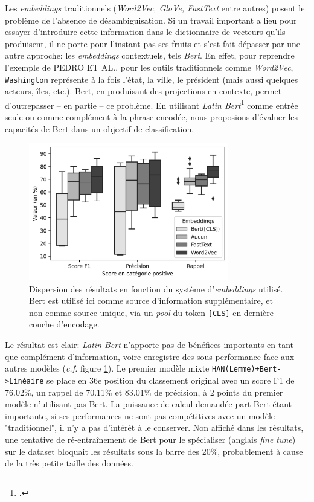 Les \textit{embeddings} traditionnels (\textit{Word2Vec, GloVe, FastText} entre autres) posent le problème de l'absence de désambiguisation. Si un travail important a lieu pour essayer d'introduire cette information dans le dictionnaire de vecteurs qu'ils produisent, il ne porte pour l'instant pas ses fruits et s'est fait dépasser par une autre approche: les \textit{embeddings} contextuels, tels \textit{Bert}. En effet, pour reprendre l'exemple de PEDRO ET AL., pour les outils traditionnels comme \textit{Word2Vec}, \texttt{Washington} représente à la fois l'état, la ville, le président (mais aussi quelques acteurs, îles, etc.). Bert, en produisant des projections en contexte, permet d'outrepasser -- en partie -- ce problème. En utilisant \textit{Latin Bert}\footcite{bamman2020latin} comme entrée seule ou comme complément à la phrase encodée, nous proposions d'évaluer les capacités de Bert dans un objectif de classification.

\begin{figure}[t]
    \centering
    \includegraphics[height=6cm]{figures/chap4/scoreDispersionEmbeddings.png}
    \caption{Dispersion des résultats en fonction du système d'\textit{embeddings} utilisé. Bert est utilisé ici comme source  d'information supplémentaire, et non comme source unique, via un \textit{pool} du token \texttt{[CLS]} en dernière couche d'encodage.}
    \label{fig:chap4:bert-dispersion-fusion}
\end{figure}

Le résultat est clair: \textit{Latin Bert} n'apporte pas de bénéfices importants en tant que complément d'information, voire enregistre des sous-performance face aux autres modèles (\textit{c.f.} figure \ref{fig:chap4:bert-dispersion-fusion}). Le premier modèle mixte \texttt{HAN(Lemme)+Bert->Linéaire} se place en 36e position du classement original avec un score F1 de 76.02\%, un rappel de 70.11\% et 83.01\% de précision, à 2 points du premier modèle n'utilisant pas Bert. La puissance de calcul demandée part Bert étant importante, si ses performances ne sont pas compétitives avec un modèle "traditionnel", il n'y a pas d'intérêt à le conserver. Non affiché dans les résultats, une tentative de ré-entraînement de Bert pour le spécialiser (anglais \textit{fine tune}) sur le dataset bloquait les résultats sous la barre des 20\%, probablement à cause de la très petite taille des données.

